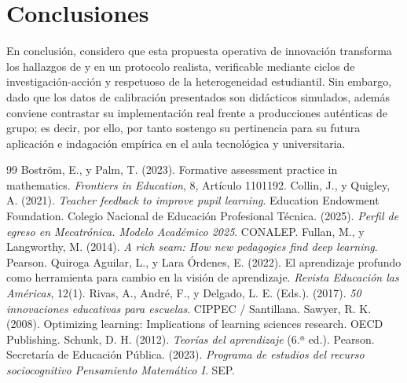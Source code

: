 \documentclass[spanish,letterpaper,oneside]{article}
\begin{document}
\clearpage
\section{Conclusiones}
En conclusión, considero que esta propuesta operativa de innovación transforma los hallazgos de \citet{quiroga2022aprendizaje} y \citet{rivas2017innovaciones} en un protocolo realista, verificable mediante ciclos de investigación-acción y respetuoso de la heterogeneidad estudiantil. Sin embargo, dado que los datos de calibración presentados son didácticos simulados, además conviene contrastar su implementación real frente a producciones auténticas de grupo; es decir, por ello, por tanto sostengo su pertinencia para su futura aplicación e indagación empírica en el aula tecnológica y universitaria.

\clearpage
\begin{thebibliography}{99}
 Boström, E., y Palm, T. (2023). Formative assessment practice in mathematics. \textit{Frontiers in Education}, 8, Artículo 1101192.
 Collin, J., y Quigley, A. (2021). \textit{Teacher feedback to improve pupil learning}. Education Endowment Foundation.
 Colegio Nacional de Educación Profesional Técnica. (2025). \textit{Perfil de egreso en Mecatrónica. Modelo Académico 2025}. CONALEP.
 Fullan, M., y Langworthy, M. (2014). \textit{A rich seam: How new pedagogies find deep learning}. Pearson.
 Quiroga Aguilar, L., y Lara Órdenes, E. (2022). El aprendizaje profundo como herramienta para cambio en la visión de aprendizaje. \textit{Revista Educación las Américas}, 12(1).
 Rivas, A., André, F., y Delgado, L. E. (Eds.). (2017). \textit{50 innovaciones educativas para escuelas}. CIPPEC / Santillana.
 Sawyer, R. K. (2008). Optimizing learning: Implications of learning sciences research. OECD Publishing.
 Schunk, D. H. (2012). \textit{Teorías del aprendizaje} (6.ª ed.). Pearson.
 Secretaría de Educación Pública. (2023). \textit{Programa de estudios del recurso sociocognitivo Pensamiento Matemático I}. SEP.
\end{thebibliography}
\end{document}
